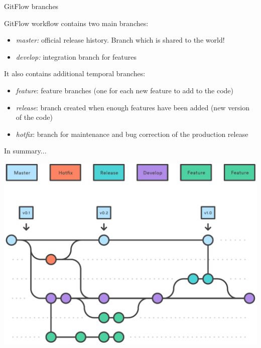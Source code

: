 \documentclass{beamer}
\begin{document}
\begin{frame}{GitFlow branches}

GitFlow workflow contains two main branches:
\begin{itemize}
\item{\emph{master:} official release history. Branch which is shared to the world!}
\item{\emph{develop:} integration branch for features}
\end{itemize}

It also contains additional temporal branches:
\begin{itemize}
\item{\emph{feature}: feature branches (one for each new feature to add to the code)}
\item{\emph{release}: branch created when enough features have been added (new version of the code)}
\item{\emph{hotfix}: branch for maintenance and bug correction of the production release}
\end{itemize}

\end{frame}

\begin{frame}{In summary...}

\begin{center}
\includegraphics[scale=0.5]{05-_2_.pdf}    
\end{center}

\end{frame}    
\end{document}

